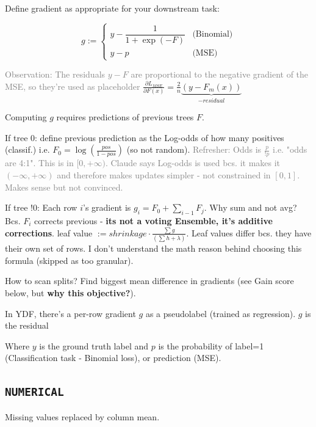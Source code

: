 \documentclass[sigconf,screen]{acmart}
\begin{document}
Define gradient as appropriate for your downstream task:

\begin{equation}
    g := 
    \begin{cases}
        y - \dfrac{1}{1 + \exp(-F)} & \text{(Binomial)} \\[4pt]
        y - p & \text{(MSE)}
    \end{cases}
\end{equation}

\textcolor{gray}{Observation: The residuals $y-F$ are proportional to the negative gradient of the MSE, so they're used as placeholder} $\frac{\partial L_{MSE}}{\partial F(x)}=\frac{2}{n}\underbrace{(y-F_m(x))}_{-residual}$

Computing $g$ requires predictions of previous trees $F$.

If tree 0: define previous prediction as the Log-odds of how many positives (classif.) i.e. $F_0=\log(\frac{pos}{1-pos})$ (so not random). \textcolor{gray}{Refresher: Odds is $\frac{p}{!p}$ i.e. "odds are 4:1". This is in $[0,+\infty)$. Claude says Log-odds is used bcs. it makes it $(-\infty,+\infty)$ and therefore makes updates simpler - not constrained in $[0,1]$. Makes sense but not convinced.}

If tree !0: Each row $i$'s gradient is $g_i=F_0+\sum_{i-1}F_j$. Why sum and not avg? Bcs. $F_i$ corrects previous - \textbf{its not a voting Ensemble, it's additive corrections}. leaf value $:= shrinkage \cdot \frac{\sum g}{(\sum h + \lambda)}$. Leaf values differ bcs. they have their own set of rows. I don't understand the math reason behind choosing this formula (skipped as too granular).

How to scan splits? Find biggest mean difference in gradients (see Gain score below, but \textbf{why this objective?}).



In YDF, there's a per-row gradient $g$ as a pseudolabel (trained as regression). $g$ is the residual



Where $y$ is the ground truth label and $p$ is the probability of label=1 (Classification task - Binomial loss), or prediction (MSE).



\subsection{\texttt{NUMERICAL}}

Missing values replaced by column mean.
\end{document}
